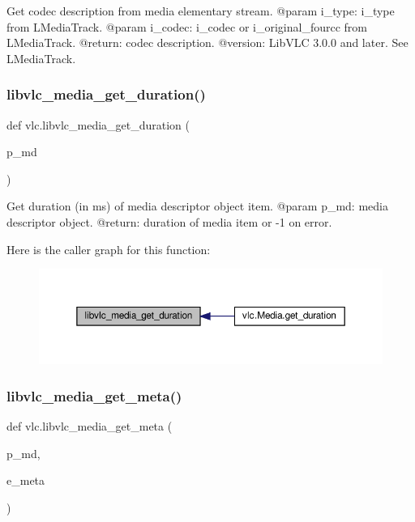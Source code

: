 \begin{DoxyVerb}Get codec description from media elementary stream.
@param i_type: i_type from L{MediaTrack}.
@param i_codec: i_codec or i_original_fourcc from L{MediaTrack}.
@return: codec description.
@version: LibVLC 3.0.0 and later. See L{MediaTrack}.
\end{DoxyVerb}
 \mbox{\label{namespacevlc_a44fa6ccd1bf97cbb7229bbc23903752d}} 
\subsubsection{\texorpdfstring{libvlc\+\_\+media\+\_\+get\+\_\+duration()}{libvlc\_media\_get\_duration()}}
{\footnotesize\ttfamily def vlc.\+libvlc\+\_\+media\+\_\+get\+\_\+duration (\begin{DoxyParamCaption}\item[{}]{p\+\_\+md }\end{DoxyParamCaption})}

\begin{DoxyVerb}Get duration (in ms) of media descriptor object item.
@param p_md: media descriptor object.
@return: duration of media item or -1 on error.
\end{DoxyVerb}
 Here is the caller graph for this function\+:
\nopagebreak
\begin{figure}[H]
\begin{center}
\leavevmode
\includegraphics[width=350pt]{namespacevlc_a44fa6ccd1bf97cbb7229bbc23903752d_icgraph}
\end{center}
\end{figure}
\mbox{\label{namespacevlc_a6c1e8a08c9abed8c2f421cd6a2036990}} 
\subsubsection{\texorpdfstring{libvlc\+\_\+media\+\_\+get\+\_\+meta()}{libvlc\_media\_get\_meta()}}
{\footnotesize\ttfamily def vlc.\+libvlc\+\_\+media\+\_\+get\+\_\+meta (\begin{DoxyParamCaption}\item[{}]{p\+\_\+md,  }\item[{}]{e\+\_\+meta }\end{DoxyParamCaption})}

